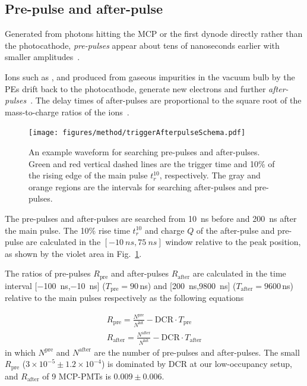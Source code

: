 \subsection{Pre-pulse and after-pulse}
\label{sec:afterpulse}
Generated from photons hitting the MCP or the first dynode directly rather than the photocathode, \emph{pre-pulses} appear about tens of nanoseconds earlier with smaller amplitudes~\cite{JUNOMassTesting}.

Ions such as ,  and  produced from gaseous impurities in the vacuum bulb by the PEs drift back to the photocathode, generate new electrons and further \emph{after-pulses}~\cite{JUNOMassTesting,Coates_1973}. The delay times of after-pulses are proportional to the square root of the mass-to-charge ratios of the ions~\cite{XENON1TTesting,Coates_1973,afterpulseTime}. %
\begin{figure}
    \centering
    \texttt{[image: figures/method/triggerAfterpulseSchema.pdf]}
    \caption{An example waveform for searching pre-pulses and after-pulses. Green and red vertical dashed lines are the trigger time and 10\% of the rising edge of the main pulse $t_r^{10}$, respectively. The gray and orange regions are the intervals for searching after-pulses and pre-pulses.}
    \label{fig:afterpulseSchema}
\end{figure}

The pre-pulses and after-pulses are searched from \SI{10}{ns} before and \SI{200}{ns} after the main pulse. The 10\% rise time $t_r^{10}$ and charge $Q$ of the after-pulse and pre-pulse are calculated in the $[-\SI{10}{ns},\SI{75}{ns}]$ window relative to the peak position, as shown by the violet area in Fig.~\ref{fig:afterpulseSchema}.

The ratios of pre-pulses $R_{\mathrm{pre}}$ and after-pulses $R_{\mathrm{after}}$ are calculated in the time interval [\SI{-100}{ns},\SI{-10}{ns}] ($T_{\mathrm{pre}}=90$\,ns) and [\SI{200}{ns},\SI{9800}{ns}] ($T_{\mathrm{after}}=9600$\,ns) relative to the main pulses respectively as the following equations

\begin{align}
    R_{\mathrm{pre}} = \frac{N^{\mathrm{pre}}}{N^\mathrm{hit}} - \mathrm{DCR}\cdot T_{\mathrm{pre}}\\
    R_{\mathrm{after}} = \frac{N^{\mathrm{after}}}{N^\mathrm{hit}} - \mathrm{DCR}\cdot T_{\mathrm{after}}
\end{align}
in which $N^{\mathrm{pre}}$ and $N^{\mathrm{after}}$ are the number of pre-pulses and after-pulses.  The small $R_{\mathrm{pre}}$ ($3\times10^{-5}\pm1.2\times10^{-4}$) is dominated by DCR at our low-occupancy setup, and $R_{\mathrm{after}}$ of 9 MCP-PMTs is $0.009\pm0.006$.


